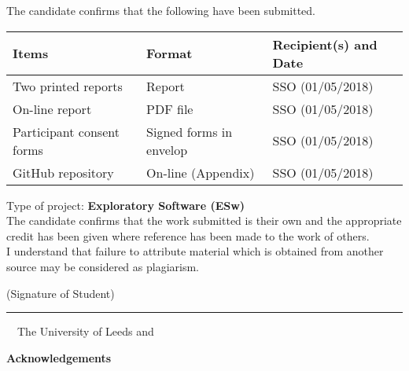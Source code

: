 \frontcover

\clearpage
\noindent The candidate confirms that the following have been submitted.\\
\begin{table}[ht!]
\begin{tabular}{|p{}|p{}|p{}|}
\hline 
Items & Format & Recipient(s) and Date \\ 
\hline 
Two printed reports & Report & SSO (01/05/2018) \\
\hline 
On-line report & PDF file & SSO (01/05/2018) \\
\hline 
Participant consent forms & Signed forms in envelop & SSO (01/05/2018) \\ 
\hline 
GitHub repository & On-line (Appendix) & SSO (01/05/2018) \\ 
\hline 
\end{tabular} 
\end{table}

\noindent Type of project: \textbf{Exploratory Software (ESw)}
\vspace{\fill}\\
\noindent The candidate confirms that the work submitted is their own and the appropriate credit has been given where reference has been made to the work of others.
\vspace{\fill}\\
\noindent I understand that failure to attribute material which is obtained from another source may be considered as plagiarism.
\vspace{\fill}\\
\begin{flushright}
(Signature of Student) \rule{50mm}{1pt}
\end{flushright}
\begin{flushleft}
\vspace{\fill}
\textcopyright~\session~The University of Leeds and~\fullname
\end{flushleft}

\begin{dissertationsummary}

\end{dissertationsummary}

\clearpage
\begin{center}
\textbf{Acknowledgements}
\end{center}


\tableofcontents


